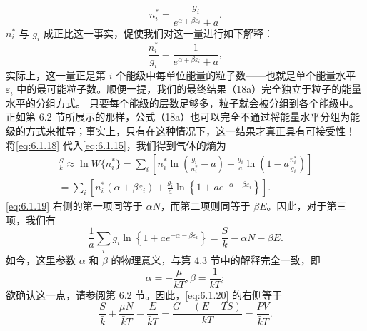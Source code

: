 \begin{equation}\tag{6.1.16}\label{eq:6.1.16}
n _ { i } ^{*} = \frac { g _ { i } } { e ^{\alpha + \beta \varepsilon _ { i} } + a } .
\end{equation}
\(n_{i}^{*}\) 与 \(g_{i}\) 成正比这一事实，促使我们对这一量进行如下解释：
\begin{equation}\tag{6.1.17}\label{eq:6.1.17}
\frac { n _ { i } ^{*} } { g _ { i } } = \frac { 1 } { e ^{\alpha + \beta \varepsilon _ { i} } + a } ,
\end{equation}
实际上，这一量正是第 \(i\) 个能级中每单位能量的粒子数——也就是单个能量水平 \(\varepsilon_i\) 中的最可能粒子数。顺便一提，我们的最终结果（18a）完全独立于粒子的能量水平的分组方式。
只要每个能级的层数足够多，粒子就会被分组到各个能级中。正如第 6.2 节所展示的那样，公式（18a）也可以完全不通过将能量水平分组为能级的方式来推导；事实上，只有在这种情况下，这一结果才真正具有可接受性！
将\autoref{eq:6.1.18} 代入\autoref{eq:6.1.15}，我们得到气体的熵为
\begin{equation}\tag{6.1.18}\label{eq:6.1.18}
\begin{array}{r} { \frac { S } { k } \approx \ln W \{ n _ { i } ^{*} \} = \sum _ { i } \left[ n _ { i } ^{*} \ln \left( \frac { g _ { i } } { n _ { i } ^{*} } - a \right) - \frac { g _ { i } } { a } \ln \left( 1 - a \frac { n _ { i } ^{*} } { g _ { i } } \right) \right] } \\{ = \sum _ { i } \left[ n _ { i } ^{*} \left( \alpha + \beta \varepsilon _ { i } \right) + \frac { g _ { i } } { a } \ln \left\{ 1 + a e ^{- \alpha - \beta \varepsilon _ { i} } \right\} \right] . } \end{array}
\end{equation}
\autoref{eq:6.1.19} 右侧的第一项同等于 \(\alpha N\)，而第二项则同等于 \(\beta E\)。因此，对于第三项，我们有
\begin{equation}\tag{6.1.19}\label{eq:6.1.19}
\frac { 1 } { a } \sum _ { i } g _ { i } \ln \left\{ 1 + a e ^{- \alpha - \beta \varepsilon _ { i} } \right\} = \frac { S } { k } - \alpha N - \beta E .
\end{equation}
如今，这里参数 \(\alpha\) 和 \(\beta\) 的物理意义，与第 4.3 节中的解释完全一致，即
\begin{equation}\tag{6.1.20}\label{eq:6.1.20}
\alpha = - \frac { \mu } { k T } ,  \beta = \frac { 1 } { k T } ;
\end{equation}
欲确认这一点，请参阅第 6.2 节。因此，\autoref{eq:6.1.20} 的右侧等于
\begin{equation}\tag{6.1.21}\label{eq:6.1.21}
\frac { S } { \bar { k } } + \frac { \mu N } { \bar { k } T } - \frac { E } { \bar { k } T } = \frac { G - ( E - T S ) } { k T } = \frac { P V } { \bar { k } T } .
\end{equation}
